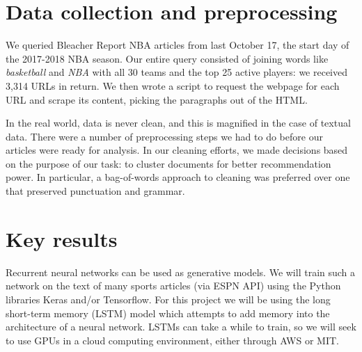 \documentclass{article}
\begin{document}
\section{Data collection and preprocessing}


We queried Bleacher Report NBA
articles from last October 17, the start day of the 2017-2018 NBA season. Our entire query consisted of
joining words like \emph{basketball} and \emph{NBA} with all 30 teams and the top 25 active players:
we received 3,314 URLs in return.
We then wrote a script to request the webpage for each URL and scrape its content, picking the
paragraphs out of the HTML.

In the real world, data is never clean, and this is magnified in the case of textual data. There
were a number of preprocessing steps we had to do before our articles were ready for analysis. In
our cleaning efforts, we made decisions based on the purpose of our task: to cluster documents for
better recommendation power. In particular, a bag-of-words approach to cleaning was preferred 
over one that preserved punctuation and grammar.

\section{Key results}

Recurrent neural networks can be used as generative models. 
We will train such a network on the text of many sports articles (via ESPN API) using the
Python libraries Keras and/or Tensorflow. For this project we will be using the long short-term memory
(LSTM) model which attempts to add memory into the architecture of a neural network. 
LSTMs can take a while to train, so we will seek to use GPUs in a cloud computing environment, 
either through AWS or MIT.

% 
\end{document}
